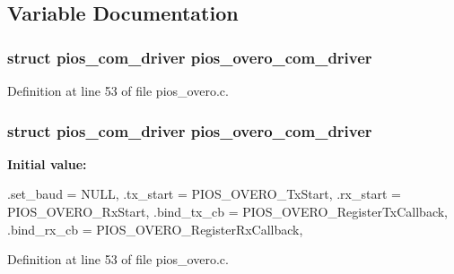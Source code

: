 \subsection{\-Variable \-Documentation}
\hypertarget{group___p_i_o_s___o_v_e_r_o_ga07e1a9093b33ec66c4e896e83834bfd6}{
\subsubsection[{pios\-\_\-overo\-\_\-com\-\_\-driver}]{\setlength{\rightskip}{0pt plus 5cm}struct {\bf pios\-\_\-com\-\_\-driver} {\bf pios\-\_\-overo\-\_\-com\-\_\-driver}}}\label{group___p_i_o_s___o_v_e_r_o_ga07e1a9093b33ec66c4e896e83834bfd6}


\-Definition at line 53 of file pios\-\_\-overo.\-c.

\hypertarget{group___p_i_o_s___o_v_e_r_o_ga07e1a9093b33ec66c4e896e83834bfd6}{
\subsubsection[{pios\-\_\-overo\-\_\-com\-\_\-driver}]{\setlength{\rightskip}{0pt plus 5cm}struct {\bf pios\-\_\-com\-\_\-driver} {\bf pios\-\_\-overo\-\_\-com\-\_\-driver}}}\label{group___p_i_o_s___o_v_e_r_o_ga07e1a9093b33ec66c4e896e83834bfd6}
{\bfseries \-Initial value\-:}
\begin{DoxyCode}
 {
        .set_baud   = NULL,
        .tx_start   = PIOS_OVERO_TxStart,
        .rx_start   = PIOS_OVERO_RxStart,
        .bind_tx_cb = PIOS_OVERO_RegisterTxCallback,
        .bind_rx_cb = PIOS_OVERO_RegisterRxCallback,
}
\end{DoxyCode}


\-Definition at line 53 of file pios\-\_\-overo.\-c.

